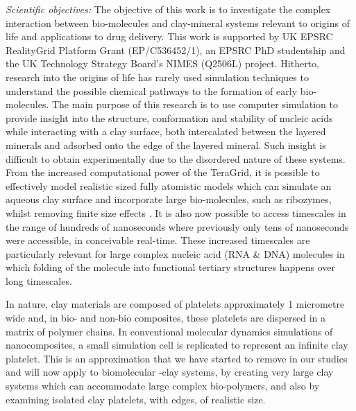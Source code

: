 \up
\emph{Scientific objectives:} The objective of this work is to %
investigate the complex interaction between bio-molecules and clay-mineral systems relevant to origins of life and applications to drug delivery. 
This work is supported by UK EPSRC RealityGrid Platform Grant (EP/C536452/1), 
an EPSRC PhD studentship and the UK Technology Strategy Board's NIMES (Q2506L) project.
Hitherto, research into the origins of life has rarely used simulation techniques to understand the possible chemical pathways to the formation of early bio-molecules. The main purpose of this research is to use computer simulation to provide insight into the structure, conformation and stability of nucleic acids while interacting with a clay surface, both intercalated between the layered minerals and adsorbed onto the edge of the layered mineral. Such insight is difficult to obtain experimentally due to the disordered nature of these systems. From the increased computational power of the TeraGrid, it is possible to effectively model realistic sized fully atomistic models which can simulate an aqueous clay surface and incorporate large bio-molecules, such as ribozymes, whilst removing finite size effects \cite{JPCC_2007}. It is also now possible to access timescales in the range of hundreds of nanoseconds where previously only tens of nanoseconds were accessible, in conceivable real-time. These increased timescales are particularly relevant for large complex nucleic acid (RNA \& DNA) molecules in which folding of the molecule into functional tertiary structures happens over long timescales. 

In nature, clay materials are composed of platelets approximately 1
micrometre wide and, in  bio- and non-bio composites, these platelets are dispersed in a matrix of 
polymer chains.  In conventional molecular dynamics simulations of nanocomposites, a small simulation cell is replicated to represent an infinite clay platelet. This is an approximation that we have started to remove in our studies and will now apply to biomolecular -clay systems, by creating very large clay systems which can accommodate large complex bio-polymers, and also by examining isolated clay platelets, with edges, of realistic size. 

